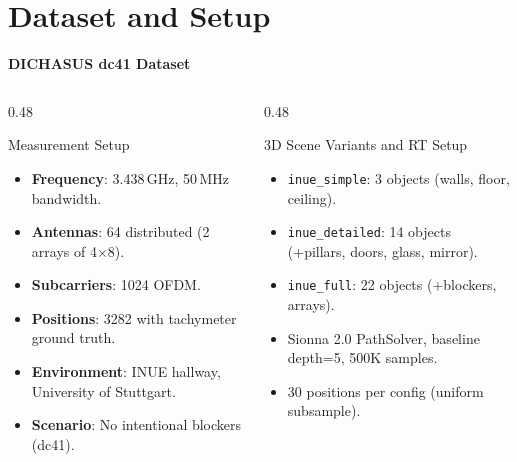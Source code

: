 \documentclass[
    aspectratio=169
]{beamer}
\begin{document}
\section{Dataset and Setup}

\begin{frame}{\textbf{DICHASUS dc41 Dataset}}
\footnotesize
\begin{columns}[T]
\begin{column}{0.48\textwidth}
\begin{block}{Measurement Setup}
\begin{itemize}
    \item \textbf{Frequency}: 3.438\,GHz, 50\,MHz bandwidth.
    \item \textbf{Antennas}: 64 distributed (2 arrays of 4$\times$8).
    \item \textbf{Subcarriers}: 1024 OFDM.
    \item \textbf{Positions}: 3282 with tachymeter ground truth.
    \item \textbf{Environment}: INUE hallway, University of Stuttgart.
    \item \textbf{Scenario}: No intentional blockers (dc41).
\end{itemize}
\end{block}
\end{column}
\begin{column}{0.48\textwidth}
\begin{block}{3D Scene Variants and RT Setup}
\begin{itemize}
    \item \texttt{inue\_simple}: 3 objects (walls, floor, ceiling).
    \item \texttt{inue\_detailed}: 14 objects (+pillars, doors, glass, mirror).
    \item \texttt{inue\_full}: 22 objects (+blockers, arrays).
    \item Sionna 2.0 PathSolver, baseline depth=5, 500K samples.
    \item 30 positions per config (uniform subsample).
\end{itemize}
\end{block}
\end{column}
\end{columns}
\normalsize
\end{frame}

\end{document}

